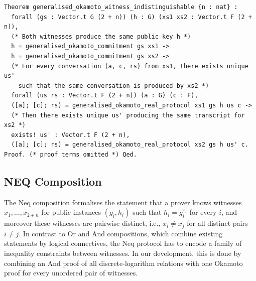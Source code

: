 \documentclass[sigconf, anonymous]{acmart}
\begin{document}
\begin{lstlisting}[frame=single, language=Coq, caption={Witness Indistinguishability},
label={wit_ind},captionpos=t, basicstyle=\ttfamily\footnotesize,
abovecaptionskip=-\medskipamount]
Theorem generalised_okamoto_witness_indistinguishable {n : nat} :
  forall (gs : Vector.t G (2 + n)) (h : G) (xs1 xs2 : Vector.t F (2 + n)),
  (* Both witnesses produce the same public key h *)
  h = generalised_okamoto_commitment gs xs1 ->
  h = generalised_okamoto_commitment gs xs2 ->
  (* For every conversation (a, c, rs) from xs1, there exists unique us' 
    such that the same conversation is produced by xs2 *)
  forall (us rs : Vector.t F (2 + n)) (a : G) (c : F),
  ([a]; [c]; rs) = generalised_okamoto_real_protocol xs1 gs h us c ->
  (* Then there exists unique us' producing the same transcript for xs2 *)
  exists! us' : Vector.t F (2 + n),
  ([a]; [c]; rs) = generalised_okamoto_real_protocol xs2 gs h us' c.
Proof. (* proof terms omitted *) Qed.
\end{lstlisting}

\subsection{NEQ Composition}
The Neq composition formalises the statement that a prover knows witnesses
$x_1, \ldots, x_{2+n}$ for public instances $(g_i, h_i)$ such that $h_i = g_i^{x_i}$ for every
$i$, and moreover these witnesses are pairwise distinct, i.e., $x_i \neq x_j$ for all distinct pairs $i \neq j$. 
In contrast to Or and And compositions, which combine existing statements by logical connectives, the Neq protocol has to encode a family of inequality constraints between witnesses.  In our development, this is done by combining an And proof of all discrete-logarithm relations with one Okamoto proof for every unordered pair of witnesses.
\end{document}
